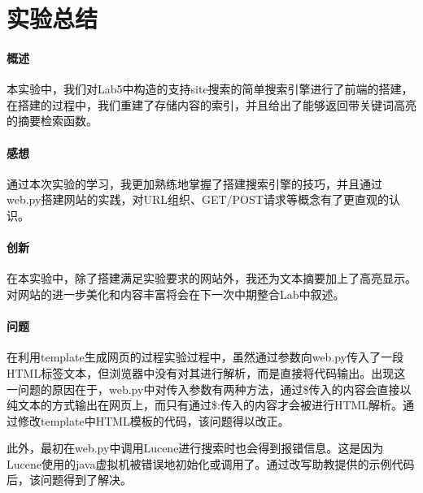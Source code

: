 \documentclass{article}
\begin{document}
\section{实验总结}
\paragraph{概述}
本实验中，我们对Lab5中构造的支持site搜索的简单搜索引擎进行了前端的搭建，在搭建的过程中，我们重建了存储内容的索引，并且给出了能够返回带关键词高亮的摘要检索函数。

\paragraph{感想}
通过本次实验的学习，我更加熟练地掌握了搭建搜索引擎的技巧，并且通过web.py搭建网站的实践，对URL组织、GET/POST请求等概念有了更直观的认识。

\paragraph{创新}
在本实验中，除了搭建满足实验要求的网站外，我还为文本摘要加上了高亮显示。对网站的进一步美化和内容丰富将会在下一次中期整合Lab中叙述。

\paragraph{问题}
在利用template生成网页的过程实验过程中，虽然通过参数向web.py传入了一段HTML标签文本，但浏览器中没有对其进行解析，而是直接将代码输出。出现这一问题的原因在于，web.py中对传入参数有两种方法，通过\$传入的内容会直接以纯文本的方式输出在网页上，而只有通过\$:传入的内容才会被进行HTML解析。通过修改template中HTML模板的代码，该问题得以改正。

此外，最初在web.py中调用Lucene进行搜索时也会得到报错信息。这是因为Lucene使用的java虚拟机被错误地初始化或调用了。通过改写助教提供的示例代码后，该问题得到了解决。
\end{document}
